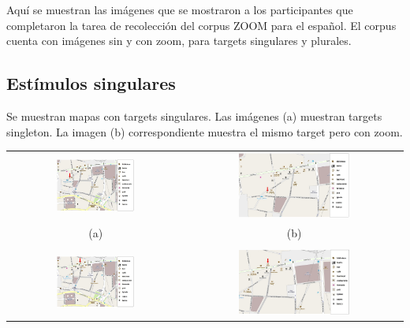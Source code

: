 Aqu\'i se muestran las im\'agenes que se mostraron a los participantes que completaron la tarea de recolecci\'on del corpus ZOOM para el espa\~nol. El corpus cuenta con im\'agenes sin y con zoom, para targets singulares y plurales.%

\subsection{Est\'imulos singulares}

Se muestran mapas con targets singulares. Las im\'agenes (a) muestran targets singleton. La imagen (b) correspondiente muestra el mismo target pero con zoom.

\noindent
\begin{center}
\begin{tabular}{c c}
\includegraphics[width=0.46\textwidth]{images/corpus/mapa3.png} & \includegraphics[width=0.53\textwidth]{images/corpus/mapa13.png} \\
(a) & (b) \\
& \\
\includegraphics[width=0.46\textwidth]{images/corpus/mapa4.png} & \includegraphics[width=0.53\textwidth]{images/corpus/mapa14.png} \\

\end{tabular}
\end{center}

